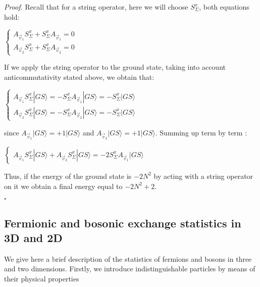 \documentclass{Configuration_Files/PoliMi3i_thesis}
\begin{document}
\textit{Proof.} \newline
Recall that for a string operator, here we will choose $S^x_\Sigma$, both equations hold:

\begin{center}
	$\begin{cases} 
		A_{\vec{v}_1}S^x_\Sigma + S^x_\Sigma A_{\vec{v}_1}  =0 \\
		A_{\vec{v}_2} S^x_\Sigma + S^x_\Sigma A_{\vec{v}_2} =0
	\end{cases}$ 
\end{center}

If we apply the string operator to the ground state, taking into account anticommutativity stated above, we obtain that:

\begin{center}
	$\begin{cases}
		A_{\vec{v}_1} S^x_\Sigma |GS\rangle = - S^x_\Sigma A_{\vec{v}_1} |GS\rangle = - S^x_\Sigma |GS\rangle \\
		
		A_{\vec{v}_2} S^x_\Sigma |GS\rangle = - S^x_\Sigma A_{\vec{v}_2} |GS\rangle = - S^x_\Sigma |GS\rangle
	\end{cases}$ 
\end{center}

since $A_{\vec{v}_1}|GS\rangle = +1|GS\rangle$ and $A_{\vec{v}_2}|GS\rangle = +1|GS\rangle$.
Summing up term by term :

\begin{center}
	$\begin{cases}
		A_{\vec{v}_1} S^x_\Sigma |GS\rangle + A_{\vec{v}_2} S^x_\Sigma |GS\rangle = - 2 S^x_\Sigma A_{\vec{v}_1} |GS\rangle
	\end{cases}$ 
\end{center}

Thus, if the energy of the ground state is $-2N^2$ by acting with a string operator on  it we obtain a final energy equal to $-2N^2+2$.

\hfill $\square$ 







\subsection{Fermionic and bosonic exchange statistics in 3D and 2D}
We give here a brief description of the statistics of fermions and bosons in three and two dimensions. \newline
Firstly, we introduce indistinguishable particles by means of their physical properties 
\end{document}

